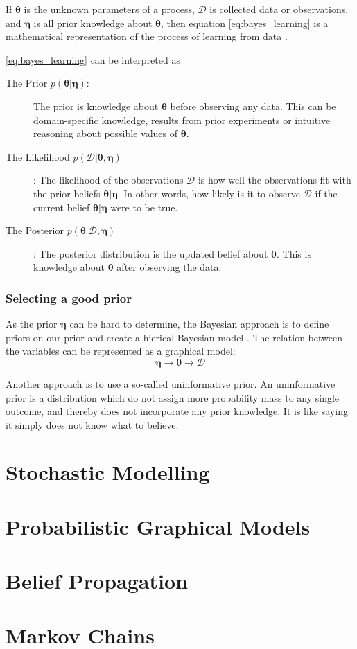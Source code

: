 If $\boldsymbol{\theta}$ is the unknown parameters of a process, $\mathcal{D}$ is collected data or observations, and $\boldsymbol{\eta}$ is all prior knowledge about $\boldsymbol{\theta}$, then equation \eqref{eq:bayes_learning} is a mathematical representation of the process of learning from data \cite{Jaynes86bayesianmethods:}.

\cref{eq:bayes_learning} can be interpreted as
\begin{description}
    \item[The Prior $p(\boldsymbol{\theta} | \boldsymbol{\eta})$:] The prior is knowledge about $\boldsymbol{\theta}$ before observing any data. This can be domain-specific knowledge, results from prior experiments or intuitive reasoning about possible values of $\boldsymbol{\theta}$. 
    \item[The Likelihood $p(\mathcal{D} | \boldsymbol{\theta}, \boldsymbol{\eta})$]: The likelihood of the observations $\mathcal{D}$ is how well the observations fit with the prior beliefs $\boldsymbol{\theta} | \boldsymbol{\eta}$. In other words, how likely is it to observe $\mathcal{D}$ if the current belief $\boldsymbol{\theta} | \boldsymbol{\eta}$ were to be true.
    \item[The Posterior $p(\boldsymbol{\theta} | \mathcal{D}, \boldsymbol{\eta})$]: The posterior distribution is the updated belief about $\boldsymbol{\theta}$. This is knowledge about $\boldsymbol{\theta}$ after observing the data. 
\end{description}

\subsubsection{Selecting a good prior}
As the prior $\boldsymbol{\eta}$ can be hard to determine, the Bayesian approach is to define priors on our prior and create a hierical Bayesian model \cite{murphy}. The relation between the variables can be represented as a graphical model:
\begin{equation*}
    \boldsymbol{\eta} \rightarrow \boldsymbol{\theta} \rightarrow{\mathcal{D}}
\end{equation*}

Another approach is to use a so-called uninformative prior. An uninformative prior is a distribution which do not assign more probability mass to any single outcome, and thereby does not incorporate any prior knowledge. It is like saying it simply does not know what to believe.





\section{Stochastic Modelling}

\section{Probabilistic Graphical Models}

\section{Belief Propagation}

\section{Markov Chains}

